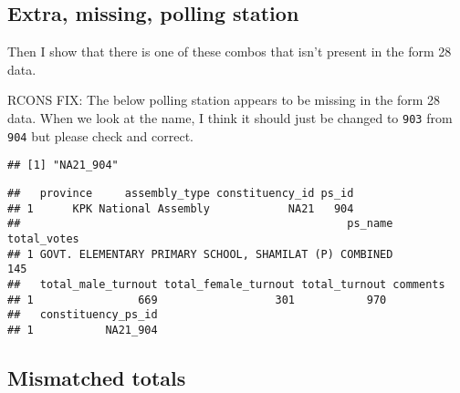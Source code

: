 \documentclass[]{article}
\newenvironment{Shaded}{\begin{snugshade}}{\end{snugshade}}
\newcommand{\CommentTok}[1]{\textcolor[rgb]{0.56,0.35,0.01}{\textit{#1}}}
\newcommand{\KeywordTok}[1]{\textcolor[rgb]{0.13,0.29,0.53}{\textbf{#1}}}
\newcommand{\NormalTok}[1]{#1}
\newcommand{\OperatorTok}[1]{\textcolor[rgb]{0.81,0.36,0.00}{\textbf{#1}}}
\newcommand{\StringTok}[1]{\textcolor[rgb]{0.31,0.60,0.02}{#1}}
\begin{document}
\hypertarget{extra-missing-polling-station}{%
\subsection{Extra, missing, polling
station}\label{extra-missing-polling-station}}

Then I show that there is one of these combos that isn't present in the
form 28 data.

RCONS FIX: The below polling station appears to be missing in the form
28 data. When we look at the name, I think it should just be changed to
\texttt{903} from \texttt{904} but please check and correct.

\begin{Shaded}
\end{Shaded}

\begin{verbatim}
## [1] "NA21_904"
\end{verbatim}

\begin{Shaded}
\end{Shaded}

\begin{verbatim}
##   province     assembly_type constituency_id ps_id
## 1      KPK National Assembly            NA21   904
##                                                  ps_name total_votes
## 1 GOVT. ELEMENTARY PRIMARY SCHOOL, SHAMILAT (P) COMBINED         145
##   total_male_turnout total_female_turnout total_turnout comments
## 1                669                  301           970         
##   constituency_ps_id
## 1           NA21_904
\end{verbatim}

\hypertarget{mismatched-totals}{%
\subsection{Mismatched totals}\label{mismatched-totals}}
\end{document}
